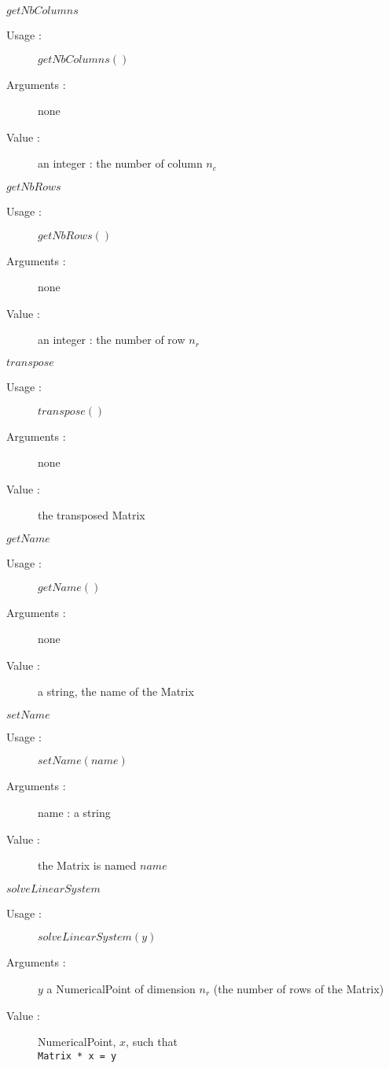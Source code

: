 \begin{description}
\begin{description}
  \item $getNbColumns$
    \begin{description}
    \item[Usage :] $getNbColumns()$
    \item[Arguments :] none
    \item[Value :] an integer : the number of column $n_c$
    \end{description}
    \bigskip

  \item $getNbRows$
    \begin{description}
    \item[Usage :] $getNbRows()$
    \item[Arguments :] none
    \item[Value :] an integer : the number of row $n_r$
    \end{description}
    \bigskip

  \item $transpose$
    \begin{description}
    \item[Usage :] $transpose()$
    \item[Arguments :] none
    \item[Value :] the transposed Matrix
    \end{description}
    \bigskip

  \item $getName$
    \begin{description}
    \item[Usage :] $getName()$
    \item[Arguments :] none
    \item[Value :] a string, the name of the Matrix
    \end{description}
    \bigskip

  \item $setName$
    \begin{description}
    \item[Usage :] $setName(name)$
    \item[Arguments :] name : a string
    \item[Value :] the Matrix is named $name$
    \end{description}
    \bigskip

  \item $solveLinearSystem$
    \begin{description}
    \item[Usage :] $solveLinearSystem(y)$
    \item[Arguments :] $y$ a NumericalPoint of dimension $n_r$
      (the number of rows of the Matrix)
    \item[Value :] NumericalPoint, $x$, such that\\
      {\tt Matrix * x = y}
    \end{description}

  \end{description}

\end{description}


